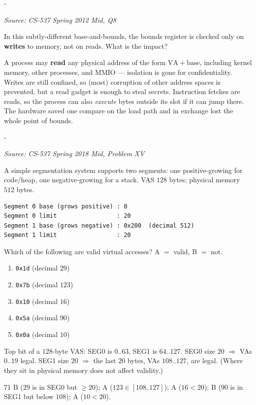 \documentclass[11pt,a4paper]{article}
\makeatletter
\newcommand{\keepspace}[1]{\par\penalty-100\begingroup
  \setlength{\dimen@}{#1}\dimen@ii\pagegoal\advance\dimen@ii-\pagetotal
  \ifdim\dimen@>\dimen@ii\ifdim\dimen@ii>\z@\vfil\fi\break\fi\endgroup}
\newcounter{qn}[section]
\newenvironment{Qn}[4]{%
  \refstepcounter{qn}\keepspace{7\baselineskip}%
  \begin{tcolorbox}[qboxstyle, title={Q\thesection.\theqn\ \ [#1 \textbar\ #2]\ \ #4}]%
  {\footnotesize\color{g3}\textit{Source: #3}}\par\smallskip%
}{%
  \end{tcolorbox}%
}
\newenvironment{Sol}{%
  \begin{tcolorbox}[sboxstyle, title={Solution}]%
}{%
  \end{tcolorbox}\vspace{0.35em}%
}
\makeatother
\begin{document}
\begin{Qn}{Medium}{Lect 9}{CS-537 Spring 2012 Mid, Q8}{Bounds is checked only on writes}
In this subtly-different base-and-bounds, the bounds register is
checked only on \textbf{writes} to memory, not on reads. What is the
impact?
\end{Qn}
\begin{Sol}
A process may \textbf{read} any physical address of the form
$\mathrm{VA}+\mathrm{base}$, including kernel memory, other
processes, and MMIO --- isolation is gone for confidentiality. Writes
are still confined, so (most) corruption of other address spaces is
prevented, but a read gadget is enough to steal secrets. Instruction
fetches are reads, so the process can also \emph{execute} bytes
outside its slot if it can jump there. The hardware saved one compare
on the load path and in exchange lost the whole point of bounds.
\end{Sol}

\begin{Qn}{Medium-Hard}{Lect 10}{CS-537 Spring 2018 Mid, Problem XV}{Which VAs hit a 20-byte grow-negative stack?}
A simple segmentation system supports two segments: one
positive-growing for code/heap, one negative-growing for a stack.
VAS $128$ bytes; physical memory $512$ bytes.

\begin{lstlisting}[numbers=none]
Segment 0 base (grows positive) : 0
Segment 0 limit                 : 20
Segment 1 base (grows negative) : 0x200  (decimal 512)
Segment 1 limit                 : 20
\end{lstlisting}

Which of the following are valid virtual accesses? A $=$ valid,
B $=$ not.
\begin{enumerate}
  \item[71.] \texttt{0x1d} (decimal $29$)
  \item[72.] \texttt{0x7b} (decimal $123$)
  \item[73.] \texttt{0x10} (decimal $16$)
  \item[74.] \texttt{0x5a} (decimal $90$)
  \item[75.] \texttt{0x0a} (decimal $10$)
\end{enumerate}
\end{Qn}
\begin{Sol}
Top bit of a $128$-byte VAS: SEG0 is $0..63$, SEG1 is $64..127$.
SEG0 size $20$ $\Rightarrow$ VAs $0..19$ legal.
SEG1 size $20$ $\Rightarrow$ the last $20$ bytes, VAs $108..127$,
are legal. (Where they sit in physical memory does not affect
validity.)

71 B ($29$ is in SEG0 but $\ge 20$); A ($123\in[108,127]$); A ($16<20$); B ($90$ is in SEG1 but below $108$); A ($10<20$).
\end{Sol}
\end{document}
